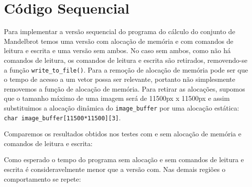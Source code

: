 \documentclass[12pt]{article}
\newcommand{\code}[1]{\texttt{#1}}
\begin{document}
\newpage
\section{Código Sequencial}
Para implementar a versão sequencial do programa do cálculo do conjunto de Mandelbrot temos uma versão com alocação de memória e com comandos de leitura e escrita e uma versão sem ambos. No caso sem ambos, como não há comandos de leitura, os comandos de leitura e escrita são retirados, removendo-se a função \code{write\_to\_file()}. Para a remoção de alocação de memória pode ser que o tempo de acesso a um vetor possa ser relevante, portanto não simplesmente removemos a função de alocação de memória. Para retirar as alocações, supomos que o tamanho máximo de uma imagem será de 11500px x 11500px e assim substituimos a alocação dinâmica do \code{image\_buffer} por uma alocação estática: \code{char image\_buffer[11500*11500][3]}.

Comparemos os resultados obtidos nos testes com e sem alocação de memória e comandos de leitura e escrita:

\begin{figure}[H]
\end{figure}

Como esperado o tempo do programa sem alocação e sem comandos de leitura e escrita é consideravelmente menor que a versão com. Nas demais regiões o comportamento se repete:
\end{document}
